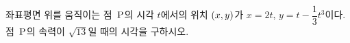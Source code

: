 좌표평면 위를 움직이는 점~$\mathrm{P}$의 시각 $t$에서의 위치 $(x{,}\mkern3mu\mathopen{}y)$가 $x=2t$, $y=t-\dfrac{1}{3}t^3$이다. 점~$\mathrm{P}$의 속력이 $\sqrt{13}$일 때의 시각을 구하시오.
